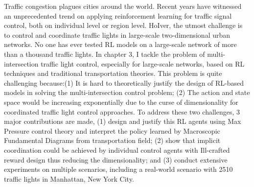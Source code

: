 \begin{englishabstract}
Traffic congestion plagues cities around the world. Recent years have witnessed an unprecedented trend on applying reinforcement learning for traffic signal control, both on individual level or region level. HoIver, the utmost challenge is to control and coordinate traffic lights in large-scale two-dimensional urban networks. No one has ever tested RL models on a large-scale network of more than a thousand traffic lights. In chapter 3, I tackle the problem of multi-intersection traffic light control, especially for large-scale networks, based on RL techniques and traditional transportation theories. This problem is quite challenging because:(1) It is hard to theoretically justify the design of RL-based models in solving the multi-intersection control problem; (2) The action and state space would be increasing exponentially due to the curse of dimensionality for coordinated traffic light control approaches. To address these two challenges, 3 major contributions are made, (1) design and justify this RL agents using Max Pressure control theory and interpret the policy learned by Macroscopic Fundamental Diagrams from transportation field; (2) show that implicit coordination could be achieved by individual control agents with Ill-crafted reward design thus reducing the dimensionality; and (3) conduct extensive experiments on multiple scenarios, including a real-world scenario with 2510 traffic lights in Manhattan, New York City.

\end{englishabstract}

